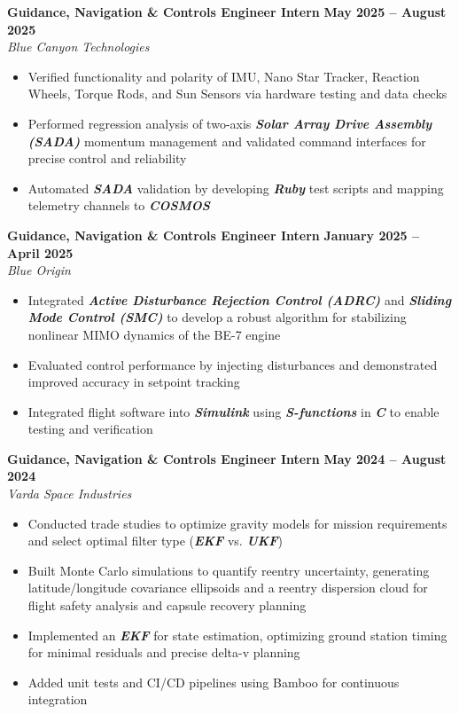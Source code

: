 \documentclass[10pt]{article}
\begin{document}
	\textbf{Guidance, Navigation \& Controls Engineer Intern} \hfill \textbf{May 2025 – August 2025} \\
	\emph{Blue Canyon Technologies}
	\begin{itemize}
		\item Verified functionality and polarity of IMU, Nano Star Tracker, Reaction Wheels, Torque Rods, and Sun Sensors via hardware testing and data checks
		\item Performed regression analysis of two-axis \textbf{\emph{Solar Array Drive Assembly (SADA)}} momentum management and validated command interfaces for precise control and reliability
		\item Automated \textbf{\emph{SADA}} validation by developing \textbf{\emph{Ruby}} test scripts and mapping telemetry channels to \textbf{\emph{COSMOS}}
	\end{itemize}
	
	\textbf{Guidance, Navigation \& Controls Engineer Intern} \hfill \textbf{January 2025 – April 2025} \\
	\emph{Blue Origin}
	\begin{itemize}
		\item Integrated \textbf{\emph{Active Disturbance Rejection Control (ADRC)}} and \textbf{\emph{Sliding Mode Control (SMC)}} to develop a robust algorithm for stabilizing nonlinear MIMO dynamics of the BE-7 engine
		\item Evaluated control performance by injecting disturbances and demonstrated improved accuracy in setpoint tracking
		\item Integrated flight software into \textbf{\emph{Simulink}} using \textbf{\emph{S-functions}} in \textbf{\emph{C}} to enable testing and verification
	\end{itemize}
	
	\textbf{Guidance, Navigation \& Controls Engineer Intern} \hfill \textbf{May 2024 – August 2024} \\
	\emph{Varda Space Industries}
	\begin{itemize}
		\item Conducted trade studies to optimize gravity models for mission requirements and select optimal filter type (\textbf{\emph{EKF}} vs. \textbf{\emph{UKF}})
		\item Built Monte Carlo simulations to quantify reentry uncertainty, generating latitude/longitude covariance ellipsoids and a reentry dispersion cloud for flight safety analysis and capsule recovery planning
		\item Implemented an \textbf{\emph{EKF}} for state estimation, optimizing ground station timing for minimal residuals and precise delta-v planning
		\item Added unit tests and CI/CD pipelines using Bamboo for continuous integration
	\end{itemize}
	
\end{document}
